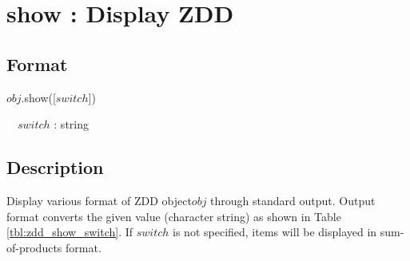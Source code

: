 
\section{show : Display ZDD\label{sect:show}}
\subsection*{Format}
$obj$.show([$switch$])

~~$switch$ : string

\subsection*{Description}
Display various format of ZDD object$obj$ through standard output. 
Output format converts the given value (character string) as shown in Table \ref{tbl:zdd_show_switch}.
If $switch$ is not specified, items will be displayed in sum-of-products format.


